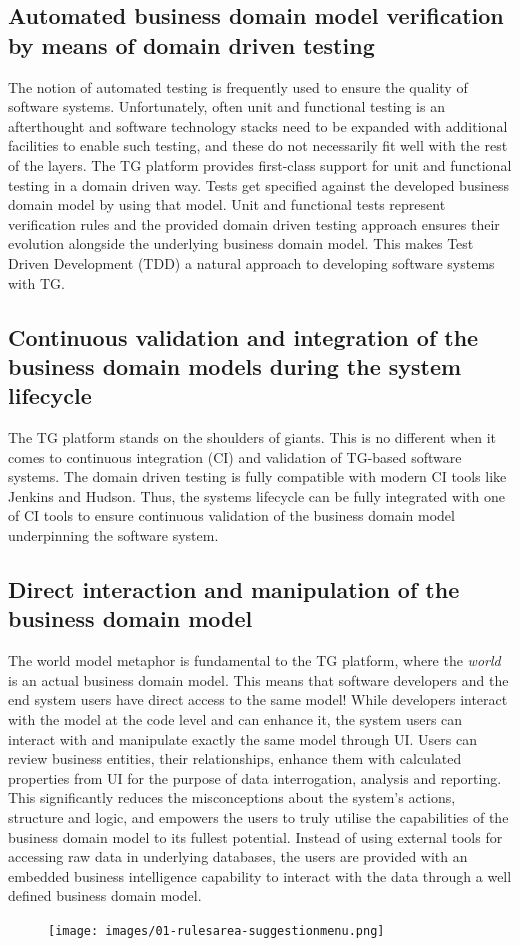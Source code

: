 \documentclass[a4paper,12pt,oneside,openright,final]{memoir} %
\begin{document}
\subsection*{Automated business domain model verification by means of domain driven testing}
	The notion of automated testing is frequently used to ensure the quality of software systems.
	Unfortunately, often unit and functional testing is an afterthought and software technology stacks need to be expanded with additional facilities to enable such testing, and these do not necessarily fit well with the rest of the layers.
	The TG platform provides first-class support for unit and functional testing in a domain driven way.
	Tests get specified against the developed business domain model by using that model.
	Unit and functional tests represent verification rules and the provided domain driven testing approach ensures their evolution alongside the underlying business domain model.
	This makes Test Driven Development (TDD) a natural approach to developing software systems with TG.
	
\subsection*{Continuous validation and integration of the business domain models during the system lifecycle}
	The TG platform stands on the shoulders of giants.
	This is no different when it comes to continuous integration (CI) and validation of TG-based software systems.
	The domain driven testing is fully compatible with modern CI tools like Jenkins and Hudson.
	Thus, the systems lifecycle can be fully integrated with one of CI tools to ensure continuous validation of the business domain model underpinning the software system.

\subsection*{Direct interaction and manipulation of the business domain model}
	The world model metaphor is fundamental to the TG platform, where the \emph{world} is an actual business domain model.
	This means that software developers and the end system users have direct access to the same model!
	While developers interact with the model at the code level and can enhance it, the system users can interact with and manipulate exactly the same model through UI.
	Users can review business entities, their relationships, enhance them with calculated properties from UI for the purpose of data interrogation, analysis and reporting.
	This significantly reduces the misconceptions about the system's actions, structure and logic, and empowers the users to truly utilise the capabilities of the business domain model to its fullest potential.
	Instead of using external tools for accessing raw data in underlying databases, the users are provided with an embedded business intelligence capability to interact with the data through a well defined business domain model.
	\begin{figure}[!h]
  		\centering
  		\texttt{[image: images/01-rulesarea-suggestionmenu.png]}  
		\vspace{-30pt} 
  	\end{figure}
\end{document}
